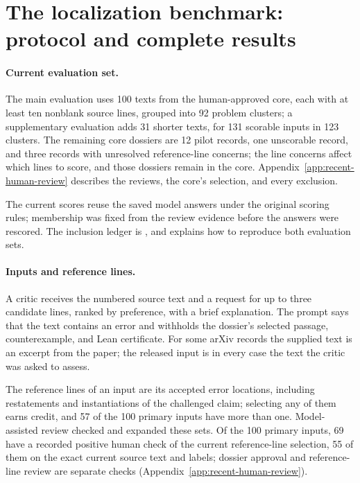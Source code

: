 \section{The localization benchmark: protocol and complete results}
\label{app:certified-localization}

\paragraph{Current evaluation set.}
The main evaluation uses 100 texts from the human-approved core, each with at least ten nonblank source lines, grouped into 92 problem clusters; a supplementary evaluation adds 31 shorter texts, for 131 scorable inputs in 123 clusters. The remaining core dossiers are 12 pilot records, one unscorable record, and three records with unresolved reference-line concerns; the line concerns affect which lines to score, and those dossiers remain in the core. Appendix~\ref{app:recent-human-review} describes the reviews, the core's selection, and every exclusion.

The current scores reuse the saved model answers under the original scoring rules; membership was fixed from the review evidence before the answers were rescored. The inclusion ledger is , and  explains how to reproduce both evaluation sets.

\paragraph{Inputs and reference lines.}
A critic receives the numbered source text and a request for up to three candidate lines, ranked by preference, with a brief explanation. The prompt says that the text contains an error and withholds the dossier's selected passage, counterexample, and Lean certificate. For some arXiv records the supplied text is an excerpt from the paper; the released input is in every case the text the critic was asked to assess.

The reference lines of an input are its accepted error locations, including restatements and instantiations of the challenged claim; selecting any of them earns credit, and 57 of the 100 primary inputs have more than one. Model-assisted review checked and expanded these sets. Of the 100 primary inputs, 69 have a recorded positive human check of the current reference-line selection, 55 of them on the exact current source text and labels; dossier approval and reference-line review are separate checks (Appendix~\ref{app:recent-human-review}).

